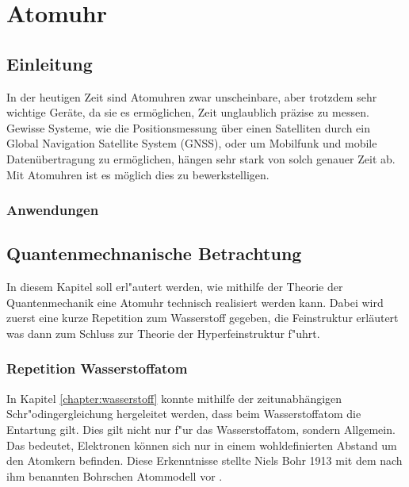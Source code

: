 \chapter{Atomuhr\label{chapter:atomuhr}}
\begin{refsection}

\section{Einleitung} %
%

In der heutigen Zeit sind Atomuhren zwar unscheinbare, aber trotzdem sehr wichtige Geräte, da sie es ermöglichen, Zeit unglaublich präzise zu messen. 
Gewisse Systeme, wie die Positionsmessung über einen Satelliten durch ein Global Navigation Satellite System (GNSS), oder um Mobilfunk und mobile Datenübertragung zu ermöglichen, hängen sehr stark von solch genauer Zeit ab.
Mit Atomuhren ist es möglich dies zu bewerkstelligen. %

\subsection{Anwendungen}
	

\section{Quantenmechnanische Betrachtung}

In diesem Kapitel soll erl"autert werden, wie mithilfe der Theorie der Quantenmechanik eine Atomuhr technisch realisiert werden kann. Dabei wird zuerst eine kurze Repetition zum Wasserstoff gegeben, die Feinstruktur erläutert was dann zum Schluss zur Theorie der Hyperfeinstruktur f"uhrt.

\subsection{Repetition Wasserstoffatom}
In Kapitel \ref{chapter:wasserstoff} konnte mithilfe der zeitunabhängigen Schr"odingergleichung hergeleitet werden, dass beim Wasserstoffatom die Entartung gilt.
Dies gilt nicht nur f"ur das Wasserstoffatom, sondern Allgemein.
Das bedeutet, Elektronen können sich nur in einem wohldefinierten Abstand um den Atomkern befinden. 
Diese Erkenntnisse stellte Niels Bohr 1913 mit dem nach ihm benannten Bohrschen Atommodell vor \cite{wiki:bohr}. 


\end{refsection}
